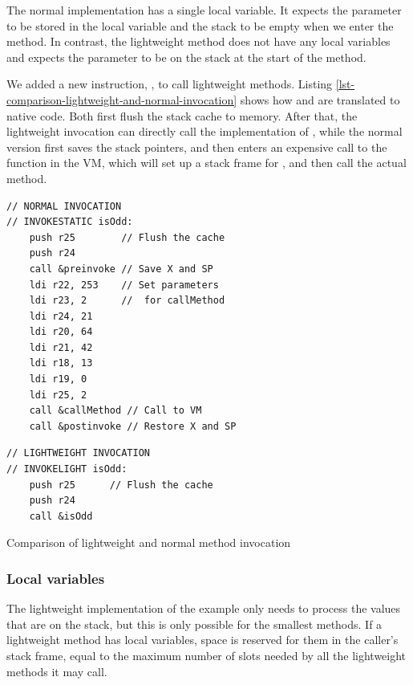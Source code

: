 The normal implementation has a single local variable. It expects the parameter to be stored in the local variable and the stack to be empty when we enter the method. In contrast, the lightweight method does not have any local variables and expects the parameter to be on the stack at the start of the method.

We added a new instruction, , to call lightweight methods. Listing \ref{lst-comparison-lightweight-and-normal-invocation} shows how  and  are translated to native code. Both first flush the stack cache to memory. After that, the lightweight invocation can directly call the implementation of , while the normal version first saves the stack pointers, and then enters an expensive call to the  function in the VM, which will set up a stack frame for , and then call the actual method.

\begin{listing}
\centering
\begin{minipage}[t]{0.5\textwidth}
\centering
\begin{verbatim}
// NORMAL INVOCATION
// INVOKESTATIC isOdd:
    push r25        // Flush the cache
    push r24
    call &preinvoke // Save X and SP
    ldi r22, 253    // Set parameters
    ldi r23, 2      //  for callMethod
    ldi r24, 21
    ldi r20, 64
    ldi r21, 42
    ldi r18, 13
    ldi r19, 0
    ldi r25, 2
    call &callMethod // Call to VM
    call &postinvoke // Restore X and SP
\end{verbatim}
\end{minipage}\hfill
\begin{minipage}[t]{0.45\textwidth}
\centering
\begin{verbatim}
// LIGHTWEIGHT INVOCATION
// INVOKELIGHT isOdd:
    push r25      // Flush the cache
    push r24
    call &isOdd
\end{verbatim}
\end{minipage}
\caption{Comparison of lightweight and normal method invocation}
\label{lst-comparison-lightweight-and-normal-invocation}
\end{listing}

\subsubsection{Local variables}
The lightweight implementation of the  example only needs to process the values that are on the stack, but this is only possible for the smallest methods. If a lightweight method has local variables, space is reserved for them in the caller's stack frame, equal to the maximum number of slots needed by all the lightweight methods it may call.

